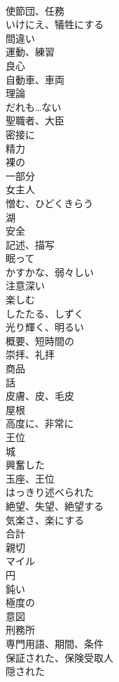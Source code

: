 \documentclass[8pt]{extreport}
\begin{document}
\begin{CJK}{UTF8}{min}
\\	使節団、任務	
\\	いけにえ、犠牲にする	
\\	間違い	
\\	運動、練習	
\\	良心	
\\	自動車、車両	
\\	理論	
\\	だれも…ない	
\\	聖職者、大臣	
\\	密接に	
\\	精力	
\\	裸の	
\\	一部分	
\\	女主人	
\\	憎む、ひどくきらう	
\\	湖	
\\	安全	
\\	記述、描写	
\\	眠って	
\\	かすかな、弱々しい	
\\	注意深い	
\\	楽しむ	
\\	したたる、しずく	
\\	光り輝く、明るい	
\\	概要、短時間の	
\\	崇拝、礼拝	
\\	商品	
\\	話	
\\	皮膚、皮、毛皮	
\\	屋根	
\\	高度に、非常に	
\\	王位	
\\	城	
\\	興奮した	
\\	玉座、王位	
\\	はっきり述べられた	
\\	絶望、失望、絶望する	
\\	気楽さ、楽にする	
\\	合計	
\\	親切	
\\	マイル
\\	円	
\\	鈍い	
\\	極度の	
\\	意図	
\\	刑務所	
\\	専門用語、期間、条件	
\\	保証された、保険受取人	
\\	隠された	

\end{CJK}
\end{document}
